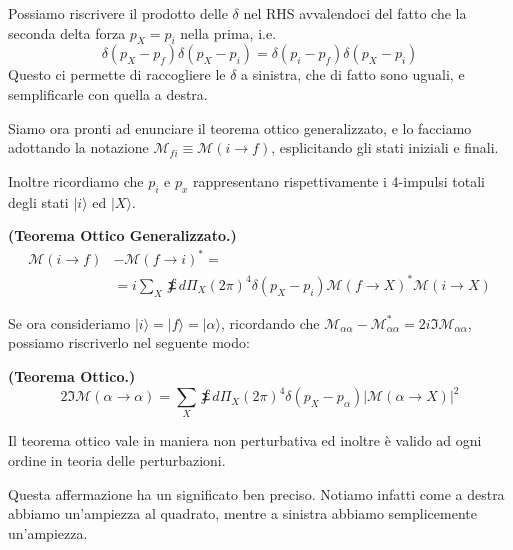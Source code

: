 \documentclass[../main.tex]{subfiles}
\begin{document}
Possiamo riscrivere il prodotto delle $\delta$ nel RHS avvalendoci del fatto che la seconda delta forza $p_X=p_i$ nella prima, i.e. 
\[\delta(p_X-p_f)\delta(p_X-p_i) = \delta(p_i-p_f)\delta(p_X-p_i)\]
Questo ci permette di raccogliere le $\delta$ a sinistra, che di fatto sono uguali, e semplificarle con quella a destra.

Siamo ora pronti ad enunciare il teorema ottico generalizzato, e lo facciamo adottando la notazione \(\mathscr M_{fi} \equiv \mathscr M(i\rightarrow f)\), esplicitando gli stati iniziali e finali.

Inoltre ricordiamo che \(p_i\) e \(p_x\) rappresentano rispettivamente i 4-impulsi totali degli stati \(|i\rangle\) ed  \(|X\rangle\).

\begin{theorem}
    \textbf{(Teorema Ottico Generalizzato.)}
    \begin{equation}
        \begin{aligned}
             \mathscr M(i\rightarrow f)& -  \mathscr M(f\rightarrow i)^* =\\&= i \sum_X \sumint d\Pi_X (2\pi)^4\delta(p_X-p_i)\mathscr M(f\rightarrow X)^* \mathscr M(i \rightarrow X)
        \end{aligned}
    \end{equation}
    \label{th:generalized_optical_theorem}
\end{theorem}

Se ora consideriamo \(|i\rangle = |f\rangle = |\alpha\rangle\), ricordando che \(\mathscr M_{\alpha\alpha} -  \mathscr M_{\alpha\alpha}^* = 2i\Im \mathscr M_{\alpha\alpha}\), possiamo riscriverlo nel seguente modo:

\begin{theorem}
    \textbf{(Teorema Ottico.)}
    \begin{equation}
         2\Im\mathscr M(\alpha \rightarrow \alpha) = \sum_X \sumint d\Pi_X (2\pi)^4\delta(p_X-p_\alpha) \big|\mathscr{M}(\alpha \rightarrow X )\big|^2
    \end{equation}
    \label{th:optical_theorem}
\end{theorem}
Il teorema ottico vale in maniera non perturbativa ed inoltre è valido ad ogni ordine in teoria delle perturbazioni.

Questa affermazione ha un significato ben preciso. Notiamo infatti come a destra abbiamo un'ampiezza al quadrato, mentre a sinistra abbiamo semplicemente un'ampiezza.
\end{document}
